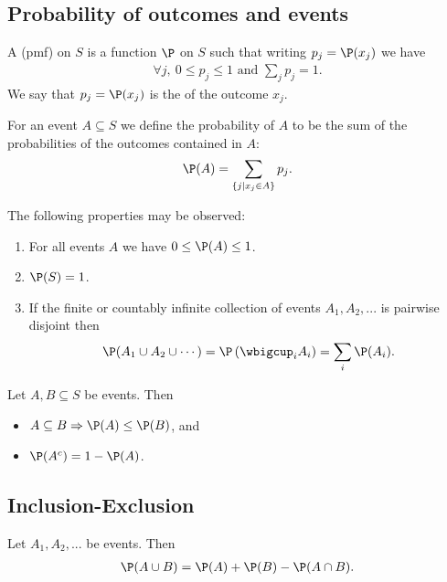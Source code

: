 \documentclass{article}
\begin{document}
\subsection{Probability of outcomes and events}
\begin{definition}
    A  (pmf) on $S$ is a function $\P$ on $S$ such that writing $p_j=\P(x_j)$ we have
    \begin{align*}
        \forall j,\:0 \leq p_j \leq 1 \text{ and } \sum_j p_j = 1.
    \end{align*}
    We say that $p_j=\P(x_j)$ is the  of the outcome $x_j$.
\end{definition}
\begin{definition}
    For an event $A\subseteq S$ we define the probability of $A$ to be the sum of the probabilities of the outcomes contained in 
    $A$: 
    \begin{align*}
        \P(A) = \sum_{\{j | x_j \in A\}} p_j.
    \end{align*}
\end{definition}
\begin{theorem}
    The following properties may be observed:
    \begin{enumerate}
        \item For all events $A$ we have $0\leq \P(A) \leq 1$.
        \item $\P(S)=1$.
        \item If the finite or countably infinite collection of events $A_1, A_2, ...$ is pairwise disjoint then
        \begin{align*}
            \P(A_1 \cup A_2 \cup \cdots) = \P\left(\wbigcup_i A_i\right) = \sum_i \P(A_i).
        \end{align*}
    \end{enumerate}
\end{theorem}
\begin{theorem}
    Let $A,B\subseteq S$ be events. Then 
    \begin{itemize}
        \item $A \subseteq B \Rightarrow \P(A) \leq \P(B)$, and
        \item $\P(A^c) = 1 - \P(A)$.
    \end{itemize}
\end{theorem}
\subsection{Inclusion-Exclusion}
\begin{theorem}
    Let $A_1, A_2, ...$ be events. Then
    \begin{align*}
        \P(A\cup B)=\P(A) + \P(B) - \P(A\cap B).
    \end{align*}
\end{theorem}
\end{document}
